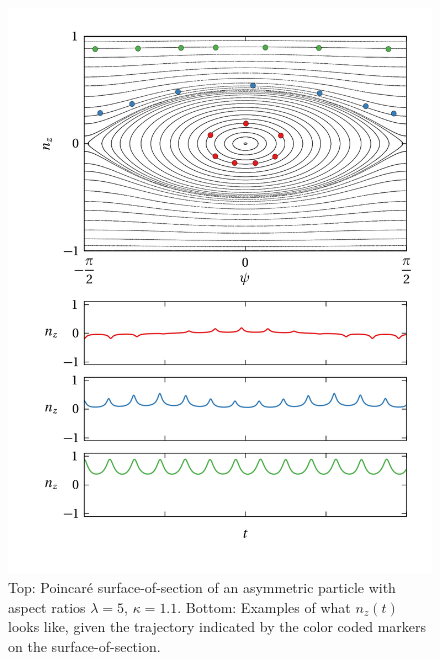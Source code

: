 \documentclass[thesis.tex]{subfiles}
\begin{document}
\begin{figure}
\centering
\includegraphics[width=12cm]{figs/poincare1o10.png}%
\caption{\label{fig:poincare1o10} Top: Poincar\'e surface-of-section of an asymmetric particle with aspect ratios $\lambda=5$, $\kappa=1.1$. Bottom: Examples of what $n_z(t)$ looks like, given the trajectory indicated by the color coded markers on the surface-of-section. 
}
\end{figure}
\end{document}
